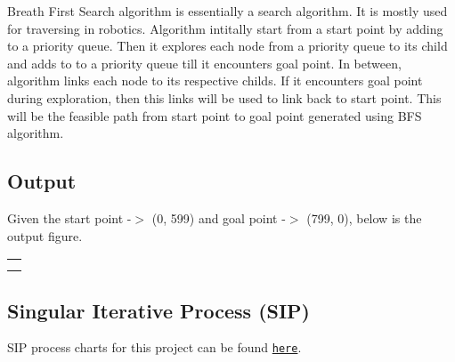 Breath First Search algorithm is essentially a search algorithm. It is mostly used for traversing in robotics. Algorithm intitally start from a start point by adding to a priority queue. Then it explores each node from a priority queue to its child and adds to to a priority queue till it encounters goal point. In between, algorithm links each node to its respective childs. If it encounters goal point during exploration, then this links will be used to link back to start point. This will be the feasible path from start point to goal point generated using B\+FS algorithm.

\subsection*{Output}

Given the start point -\/$>$ (0, 599) and goal point -\/$>$ (799, 0), below is the output figure. \tabulinesep=1mm
\begin{longtabu} spread 0pt [c]{*1{|X[-1]}|}
\hline
{}\\
\endfirsthead
\hline
\endfoot
\hline
{}\\
\endhead
 \\
\end{longtabu}
\subsection*{Singular Iterative Process (S\+IP)}

S\+IP process charts for this project can be found \href{https://docs.google.com/spreadsheets/d/1IbgtYZAE8amdw-byhspCRRnXf8tBoE707xSWsrF4pjw/edit?usp=sharing}{\tt here}. 